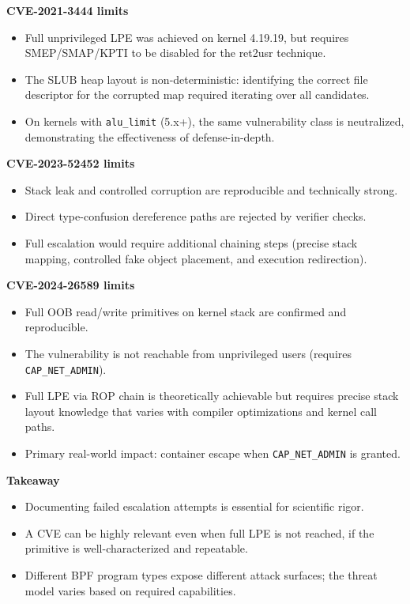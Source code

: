 \textbf{CVE-2021-3444 limits}
\begin{itemize}
	\item Full unprivileged LPE was achieved on kernel 4.19.19, but requires SMEP/SMAP/KPTI to be disabled for the ret2usr technique.
	\item The SLUB heap layout is non-deterministic: identifying the correct file descriptor for the corrupted map required iterating over all candidates.
	\item On kernels with \texttt{alu\_limit} (5.x+), the same vulnerability class is neutralized, demonstrating the effectiveness of defense-in-depth.
\end{itemize}

\textbf{CVE-2023-52452 limits}
\begin{itemize}
	\item Stack leak and controlled corruption are reproducible and technically strong.
	\item Direct type-confusion dereference paths are rejected by verifier checks.
	\item Full escalation would require additional chaining steps (precise stack mapping, controlled fake object placement, and execution redirection).
\end{itemize}

\textbf{CVE-2024-26589 limits}
\begin{itemize}
	\item Full OOB read/write primitives on kernel stack are confirmed and reproducible.
	\item The vulnerability is not reachable from unprivileged users (requires \texttt{CAP\_NET\_ADMIN}).
	\item Full LPE via ROP chain is theoretically achievable but requires precise stack layout knowledge that varies with compiler optimizations and kernel call paths.
	\item Primary real-world impact: container escape when \texttt{CAP\_NET\_ADMIN} is granted.
\end{itemize}

\textbf{Takeaway}
\begin{itemize}
	\item Documenting failed escalation attempts is essential for scientific rigor.
	\item A CVE can be highly relevant even when full LPE is not reached, if the primitive is well-characterized and repeatable.
	\item Different BPF program types expose different attack surfaces; the threat model varies based on required capabilities.
\end{itemize}

